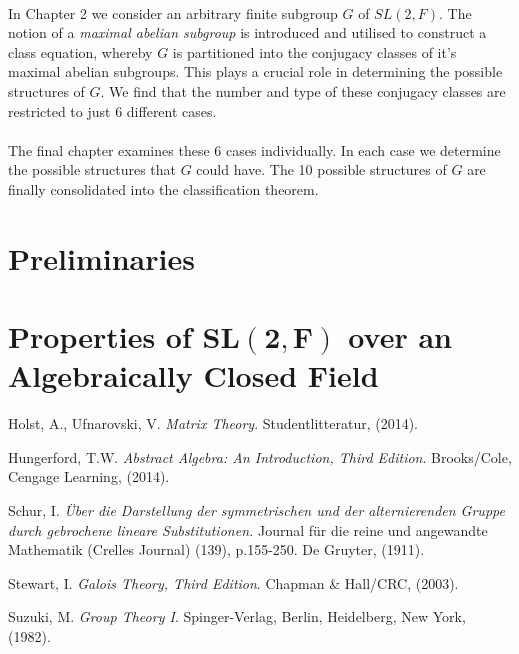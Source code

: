 \documentclass[a4paper , 11pt]{book}
\theoremstyle{definition}
\theoremstyle{remark}
\begin{document}
\vspace{-0.2mm}
\\
In Chapter 2 we consider an arbitrary finite subgroup $G$ of $SL(2,F)$. The notion of a \textit{maximal abelian subgroup} is introduced and utilised to construct a class equation, whereby $G$ is partitioned into the conjugacy classes of it's maximal abelian subgroups. This plays a crucial role in determining the possible structures of $G$. We find that the number and type of these conjugacy classes are restricted to just 6 different cases. \\
\vspace{-0.2mm}
\\
The final chapter examines these 6 cases individually. In each case we determine the possible structures that $G$ could have. The 10 possible structures of $G$ are finally consolidated into the classification theorem.


\newpage\phantom{blabla}
\thispagestyle{plain}

\chapter[Preliminaries]{Preliminaries}


\chapter[Properties of $\pmb{SL(2,F)}$ over an Algebraically Closed Field]{Properties of $\pmb{SL(2,F)}$ over an Algebraically Closed Field}








\begin{thebibliography}{9}








Holst, A., Ufnarovski, V. 
\textit{Matrix Theory}. 
Studentlitteratur,
(2014).

Hungerford, T.W. 
\textit{Abstract Algebra: An Introduction, Third Edition}. 
Brooks/Cole, Cengage Learning,
(2014).

Schur, I. 
\textit{Über die Darstellung der symmetrischen und der alternierenden Gruppe durch gebrochene lineare Substitutionen.} Journal für die reine und angewandte Mathematik (Crelles Journal) (139), p.155-250. 
De Gruyter,
(1911).

Stewart, I. 
\textit{Galois Theory, Third Edition}. 
Chapman \& Hall/CRC,
(2003).

Suzuki, M. 
\textit{Group Theory I}. 
Spinger-Verlag, Berlin, Heidelberg, New York, 
(1982).

\end{thebibliography}
\end{document}
